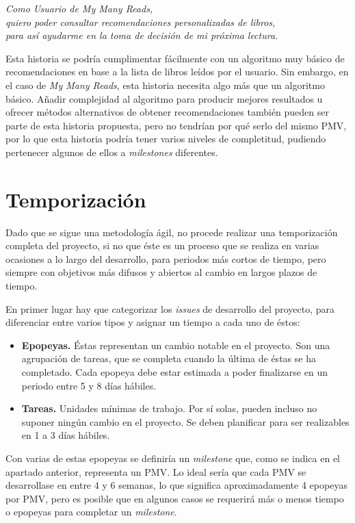 \begin{center}
    \textit{Como Usuario de My Many Reads,}\\
    \textit{quiero poder consultar recomendaciones personalizadas de libros,}\\
    \textit{para así ayudarme en la toma de decisión de mi próxima lectura.}
\end{center}

Esta historia se podría cumplimentar fácilmente con un algoritmo muy básico de recomendaciones en base a la lista de libros leídos por el usuario. Sin embargo, en el caso de \textit{My Many Reads}, esta historia necesita algo más que un algoritmo básico. Añadir complejidad al algoritmo para producir mejores resultados u ofrecer métodos alternativos de obtener recomendaciones también pueden ser parte de esta historia propuesta, pero no tendrían por qué serlo del mismo PMV, por lo que esta historia podría tener varios niveles de completitud, pudiendo pertenecer algunos de ellos a \textit{milestones} diferentes.

\section{Temporización}

Dado que se sigue una metodología ágil, no procede realizar una temporización completa del proyecto, si no que éste es un proceso que se realiza en varias ocasiones a lo largo del desarrollo, para periodos más cortos de tiempo, pero siempre con objetivos más difusos y abiertos al cambio en largos plazos de tiempo.

En primer lugar hay que categorizar los \textit{issues} de desarrollo del proyecto, para diferenciar entre varios tipos y asignar un tiempo a cada uno de éstos:

\begin{itemize}
    \item \textbf{Epopeyas.} Éstas representan un cambio notable en el proyecto. Son una agrupación de tareas, que se completa cuando la última de éstas se ha completado. Cada epopeya debe estar estimada a poder finalizarse en un periodo entre 5 y 8 días hábiles.
    \item \textbf{Tareas.} Unidades mínimas de trabajo. Por sí solas, pueden incluso no suponer ningún cambio en el proyecto. Se deben planificar para ser realizables en 1 a 3 días hábiles.
\end{itemize}

Con varias de estas epopeyas se definiría un \textit{milestone} que, como se indica en el apartado anterior, representa un PMV. Lo ideal sería que cada PMV se desarrollase en entre 4 y 6 semanas, lo que significa aproximadamente 4 epopeyas por PMV, pero es posible que en algunos casos se requerirá más o menos tiempo o epopeyas para completar un \textit{milestone}.

